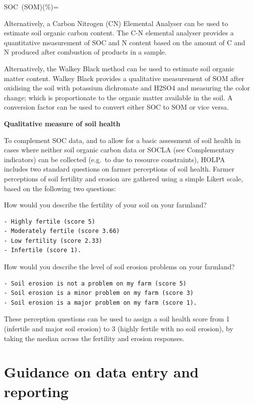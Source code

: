 \documentclass[
  letterpaper,
  DIV=11,
  numbers=noendperiod]{scrreprt}
\begin{document}
SOC~\left(SOM\right)\left(\%\right)=

Alternatively, a Carbon Nitrogen (CN) Elemental Analyser can be used to
estimate soil organic carbon content. The C-N elemental analyser
provides a quantitative measurement of SOC and N content based on the
amount of C and N produced after combustion of products in a sample.

Alternatively, the Walkey Black method can be used to estimate soil
organic matter content. Walkey Black provides a qualitative measurement
of SOM after oxidising the soil with potassium dichromate and H2SO4 and
measuring the color change; which is proportionate to the organic matter
available in the soil. A conversion factor can be used to convert either
SOC to SOM or vice versa.

\textbf{Qualitative measure of soil health}

To complement SOC data, and to allow for a basic assessment of soil
health in cases where neither soil organic carbon data or SOCLA (see
Complementary indicators) can be collected (e.g.~to due to resource
constraints), HOLPA includes two standard questions on farmer
perceptions of soil health. Farmer perceptions of soil fertility and
erosion are gathered using a simple Likert scale, based on the following
two questions:

How would you describe the fertility of your soil on your farmland?

\begin{verbatim}
- Highly fertile (score 5)
- Moderately fertile (score 3.66)
- Low fertility (score 2.33)
- Infertile (score 1).
\end{verbatim}

How would you describe the level of soil erosion problems on your
farmland?

\begin{verbatim}
- Soil erosion is not a problem on my farm (score 5)
- Soil erosion is a minor problem on my farm (score 3)
- Soil erosion is a major problem on my farm (score 1).
\end{verbatim}

These perception questions can be used to assign a soil health score
from 1 (infertile and major soil erosion) to 3 (highly fertile with no
soil erosion), by taking the median across the fertility and erosion
responses.

\section{Guidance on data entry and
reporting}\label{guidance-on-data-entry-and-reporting-2}
\end{document}
